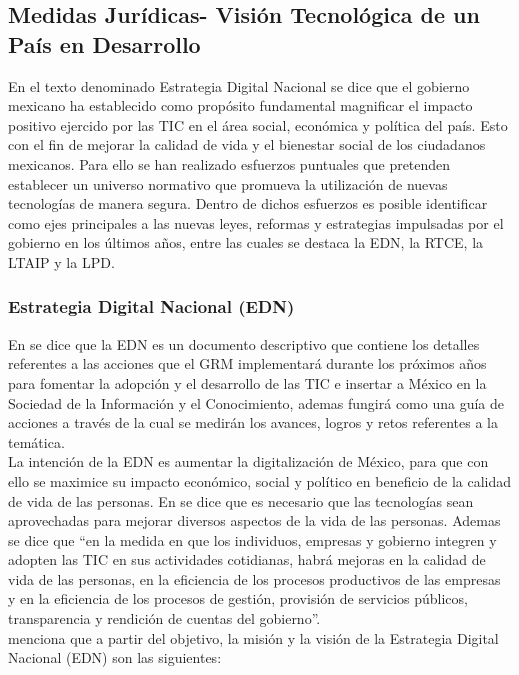 \documentclass[runningheads,a4paper]{llncs}
\begin{document}
\subsection{Medidas Jurídicas- Visión Tecnológica de un País en Desarrollo}
En el texto denominado Estrategia Digital Nacional \cite{EDN_1} se dice que el gobierno mexicano ha establecido como propósito fundamental magnificar el impacto positivo ejercido por las \gls{TIC} en el área social, económica y política del país. Esto con el fin de mejorar la calidad de vida y el bienestar social de los ciudadanos mexicanos. Para ello se han realizado esfuerzos puntuales que pretenden establecer un universo normativo que promueva la utilización de nuevas tecnologías de manera segura. Dentro de dichos esfuerzos es posible identificar como ejes principales a las nuevas leyes, reformas y estrategias impulsadas por el gobierno en los últimos años, entre las cuales se destaca la \gls{EDN}, la \gls{RTCE}, la \gls{LTAIP} y la \gls{LPD}.  

\subsubsection{Estrategia Digital Nacional (EDN)}  
En \cite{EDN_1} se dice que la \gls{EDN} es un documento descriptivo que contiene los detalles referentes a las acciones que el \gls{GRM} implementará durante los próximos años para fomentar la adopción y el desarrollo de las TIC e insertar a México en la Sociedad de la Información y el Conocimiento, ademas fungirá como una guía de acciones a través de la cual se medirán los avances, logros y retos referentes a la temática.\\ 

La intención de la \gls{EDN} es aumentar la digitalización de México, para que
con ello se maximice su impacto económico, social y político en beneficio de la calidad de vida de
las personas. En \cite{EDN_1} se dice que es necesario que las tecnologías sean aprovechadas para mejorar diversos aspectos de la vida de las personas. Ademas se dice que ``en la medida en que los individuos, empresas y gobierno integren y adopten las TIC en sus actividades cotidianas, habrá mejoras en la calidad de vida de las personas, en la eficiencia de los procesos productivos de las empresas y en la eficiencia de los procesos de gestión, provisión de servicios públicos, transparencia y rendición de cuentas del gobierno''.\\

\cite{EDN_1} menciona que a partir del objetivo, la misión y la visión de la Estrategia Digital Nacional (EDN) son las siguientes:
\end{document}

